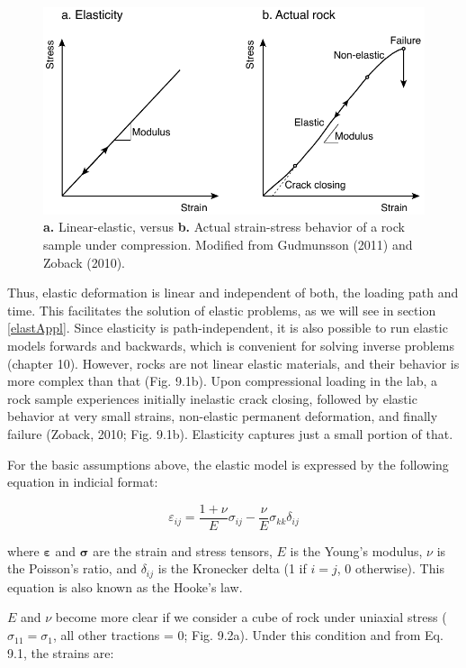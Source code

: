 \documentclass[a4paper , 12pt]{book}
\begin{document}
\begin{figure}[ht]
    \centering
    \includegraphics[width=13cm]{ch9f1.pdf}
    \caption{\textbf{a.} Linear-elastic, versus \textbf{b.} Actual strain-stress behavior of a rock sample under compression. Modified from Gudmunsson (2011) and Zoback (2010).}
\end{figure}

Thus, elastic deformation is linear and independent of both, the loading path and time. This facilitates the solution of elastic problems, as we will see in section \ref{elastAppl}. Since elasticity is path-independent, it is also possible to run elastic models forwards and backwards, which is convenient for solving inverse problems (chapter 10). However, rocks are not linear elastic materials, and their behavior is more complex than that (Fig. 9.1b). Upon compressional loading in the lab, a rock sample experiences initially inelastic crack closing, followed by elastic behavior at very small strains, non-elastic permanent deformation, and finally failure (Zoback, 2010; Fig. 9.1b). Elasticity captures just a small portion of that.

For the basic assumptions above, the elastic model is expressed by the following equation in indicial format:

\begin{equation}\label{eq9.1}
    \varepsilon_{ij}=\frac{1+\nu}{E}\sigma_{ij}-\frac{\nu}{E}\sigma_{kk}\delta_{ij}
\end{equation}

where $\boldsymbol{\varepsilon}$ and $\boldsymbol{\sigma}$ are the strain and stress tensors, $E$ is the Young's modulus, $\nu$ is the Poisson's ratio, and $\delta_{ij}$ is the Kronecker delta (1 if $i = j$, 0 otherwise). This equation is also known as the Hooke's law.

$E$ and $\nu$ become more clear if we consider a cube of rock under uniaxial stress ($\sigma_{11}=\sigma_1$, all other tractions = 0; Fig. 9.2a). Under this condition and from Eq. 9.1, the strains are:
\end{document}
